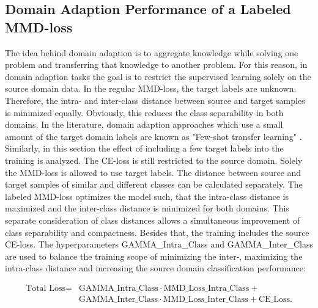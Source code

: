 \subsection{Domain Adaption Performance of a Labeled MMD-loss} \label{sec:Differences of labeled and unlabeled MMD loss}

The idea behind domain adaption is to aggregate knowledge while solving one problem and transferring that knowledge to another problem. For this reason, in domain adaption tasks the goal is to restrict the supervised learning solely on the source domain data. In the regular MMD-loss, the target labels are unknown. Therefore, the intra- and inter-class distance between source and target samples is minimized equally. Obviously, this reduces the class separability in both domains. In the literature, domain adaption approaches which use a small amount of the target domain labels are known as "Few-shot transfer learning" \cite{WU2020}. Similarly, in this section the effect of including a few target labels into the training is analyzed. The CE-loss is still restricted to the source domain. Solely the MMD-loss is allowed to use target labels. The distance between source and target samples of similar and different classes can be calculated separately. The labeled MMD-loss optimizes the model such, that the intra-class distance is maximized and the inter-class distance is minimized for both domains. This separate consideration of class distances allows a simultaneous improvement of class separability and compactness. Besides that, the training includes the source CE-loss. The hyperparameters GAMMA\_Intra\_Class and GAMMA\_Inter\_Class are used to balance the training scope of minimizing the inter-, maximizing the intra-class distance and increasing the source domain classification performance:

\begin{equation}
\begin{split}
    \mbox{Total Loss} = & \mbox{GAMMA\_Intra\_Class}  \cdot \mbox{MMD\_Loss\_Intra\_Class} + \\
                              &\mbox{GAMMA\_Inter\_Class} \cdot \mbox{MMD\_Loss\_Inter\_Class} + \mbox{CE\_Loss}.
\end{split}
\end{equation}


